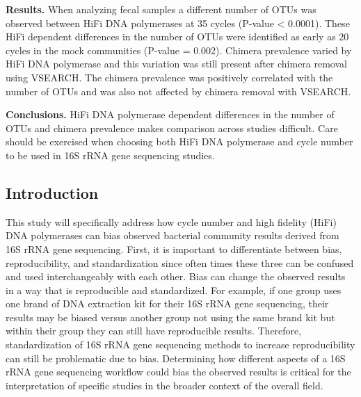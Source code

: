 \documentclass[12pt,]{article}
\begin{document}
\textbf{Results.} When analyzing fecal samples a different number of
OTUs was observed between HiFi DNA polymerases at 35 cycles (P-value
\textless{} 0.0001). These HiFi dependent differences in the number of
OTUs were identified as early as 20 cycles in the mock communities
(P-value = 0.002). Chimera prevalence varied by HiFi DNA polymerase and
this variation was still present after chimera removal using VSEARCH.
The chimera prevalence was positively correlated with the number of OTUs
and was also not affected by chimera removal with VSEARCH.

\textbf{Conclusions.} HiFi DNA polymerase dependent differences in the
number of OTUs and chimera prevalence makes comparison across studies
difficult. Care should be exercised when choosing both HiFi DNA
polymerase and cycle number to be used in 16S rRNA gene sequencing
studies.

\newpage

\subsection{Introduction}\label{introduction}

This study will specifically address how cycle number and high fidelity
(HiFi) DNA polymerases can bias observed bacterial community results
derived from 16S rRNA gene sequencing. First, it is important to
differentiate between bias, reproducibility, and standardization since
often times these three can be confused and used interchangeably with
each other. Bias can change the observed results in a way that is
reproducible and standardized. For example, if one group uses one brand
of DNA extraction kit for their 16S rRNA gene sequencing, their results
may be biased versus another group not using the same brand kit but
within their group they can still have reproducible results. Therefore,
standardization of 16S rRNA gene sequencing methods to increase
reproducibility can still be problematic due to bias. Determining how
different aspects of a 16S rRNA gene sequencing workflow could bias the
observed results is critical for the interpretation of specific studies
in the broader context of the overall field.
\end{document}
